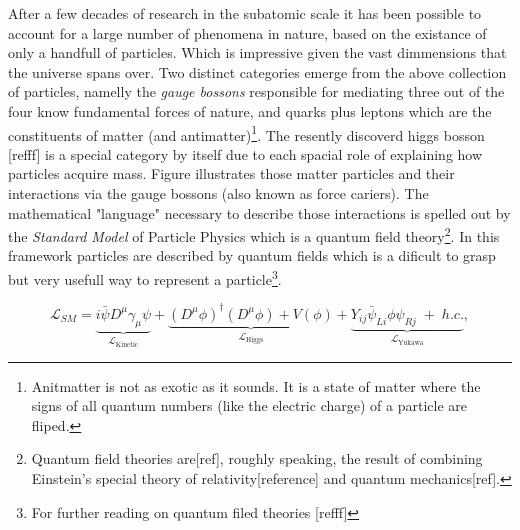 After a few decades of research in the subatomic scale it has been possible to account for a large number of phenomena
in nature, based on the existance of only a handfull of particles. Which is impressive given the vast dimmensions that the
universe spans over. Two distinct categories emerge from the above collection of particles, namelly the {\it gauge
bossons} responsible for mediating three out of the four know fundamental forces of nature, and quarks plus leptons which are the
constituents of matter
(and antimatter)\footnote{Anitmatter is not as exotic as it sounds. It is a state of matter where the
signs of all quantum numbers (like the electric charge) of a particle are fliped.}.
The resently discoverd higgs bosson [refff] is a special category by itself due to each spacial role of explaining how particles acquire mass.
Figure \figref{} illustrates those matter particles and their interactions via the gauge bossons (also known as force cariers).
The mathematical "language" necessary to describe those interactions is spelled out by the \textit{Standard Model} of Particle Physics
which is a quantum field
theory\footnote{Quantum field theories are[ref], roughly speaking, the result of combining Einstein's special theory of
relativity[reference] and quantum mechanics[ref].}.
In this framework particles are described by quantum fields which is a dificult
to grasp but very usefull way to represent a
particle\footnote{For further reading on quantum filed theories [refff]}.

\begin{equation}
\mathscr{L}_{SM} = \underbrace{i \bar\psi D^{\mu} \gamma _{\mu} \psi}_{\mathscr{L}_{\text{Kinetic}}} +
                   \underbrace{(D^\mu\phi)^{\dagger} (D^\mu\phi) + V(\phi)}_{\mathscr{L}_{\text{Higgs}}} +
                   \underbrace{Y_{ij}\bar\psi_{Li}\phi\psi_{Rj} \; + \; h.c.}_{\mathscr{L}_{\text{Yukawa}}},
\label{lagrangian}
\end{equation}


